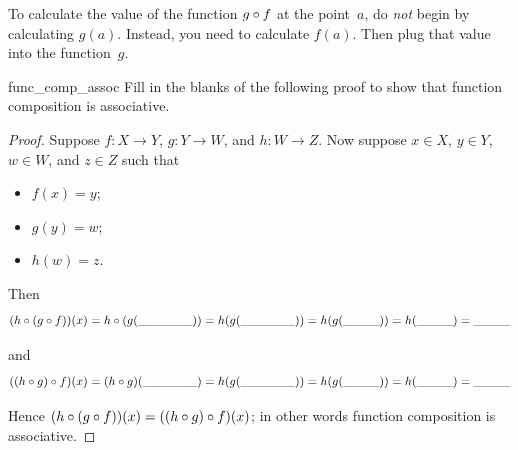 \begin{warn} \label{ComposeWarn}
To calculate the value of the function $g \circ f$ at the point~$a$, do \emph{not} begin by calculating $g(a)$. Instead, you need to calculate $f(a)$. Then plug that value into the function~$g$.
\end{warn}

\begin{exercise}{func_comp_assoc}
Fill in the blanks of the following proof to show that function composition is associative.

\begin{proof}
Suppose $f: X \to Y$, $g: Y \to W$, and $h: W \to Z$.  Now suppose $x \in X$, $y \in Y$, $w \in W$, and $z \in Z$ such that 
\begin{itemize}
\item
$f(x) = y$;
\item
$g(y) = w$;
\item 
$h(w) = z$.
\end{itemize}

\noindent
Then 
\[
(h \circ (g \circ f))(x) = h \circ (g(\_\_\_\_\_\_)) = h(g(\_\_\_\_\_\_)) = h(g(\_\_\_\_)) = h(\_\_\_\_) = \_\_\_\_ \]

\noindent
and
\[
((h \circ g) \circ f)(x) = (h \circ g)(\_\_\_\_\_\_) = h(g(\_\_\_\_\_\_)) = h(g(\_\_\_\_)) = h(\_\_\_\_) = \_\_\_\_ \]

\noindent
Hence $(h \circ (g \circ f))(x) = ((h \circ g) \circ f)(x)$; in other words function composition is associative.
\end{proof}
\end{exercise}

